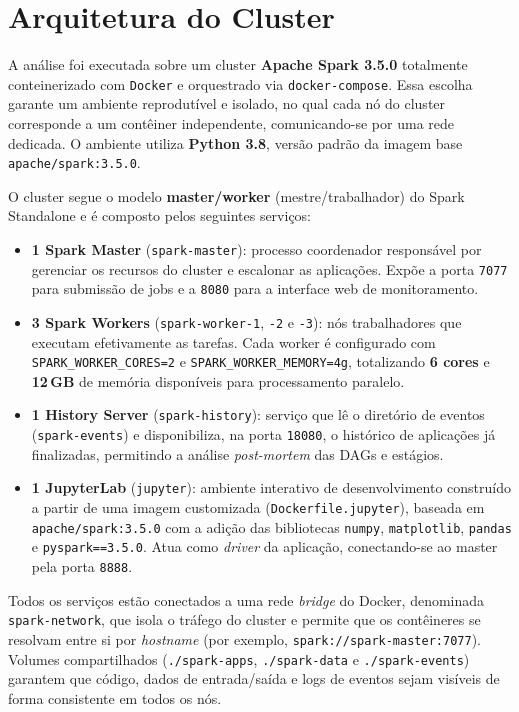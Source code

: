 \section{Arquitetura do Cluster}
\label{sec:arquitetura}

A análise foi executada sobre um cluster \textbf{Apache Spark 3.5.0} totalmente
conteinerizado com \texttt{Docker} e orquestrado via \texttt{docker-compose}. Essa
escolha garante um ambiente reprodutível e isolado, no qual cada nó do cluster
corresponde a um contêiner independente, comunicando-se por uma rede dedicada. O
ambiente utiliza \textbf{Python 3.8}, versão padrão da imagem base
\texttt{apache/spark:3.5.0}.

O cluster segue o modelo \textbf{master/worker} (mestre/trabalhador) do Spark Standalone
e é composto pelos seguintes serviços:

\begin{itemize}
  \item \textbf{1 Spark Master} (\texttt{spark-master}): processo coordenador
        responsável por gerenciar os recursos do cluster e escalonar as aplicações.
        Expõe a porta \texttt{7077} para submissão de jobs e a \texttt{8080} para a
        interface web de monitoramento.
  \item \textbf{3 Spark Workers} (\texttt{spark-worker-1}, \texttt{-2} e \texttt{-3}):
        nós trabalhadores que executam efetivamente as tarefas. Cada worker é
        configurado com \texttt{SPARK\_WORKER\_CORES=2} e
        \texttt{SPARK\_WORKER\_MEMORY=4g}, totalizando \textbf{6 cores} e
        \textbf{12\,GB} de memória disponíveis para processamento paralelo.
  \item \textbf{1 History Server} (\texttt{spark-history}): serviço que lê o diretório
        de eventos (\texttt{spark-events}) e disponibiliza, na porta \texttt{18080}, o
        histórico de aplicações já finalizadas, permitindo a análise \textit{post-mortem}
        das DAGs e estágios.
  \item \textbf{1 JupyterLab} (\texttt{jupyter}): ambiente interativo de
        desenvolvimento construído a partir de uma imagem customizada
        (\texttt{Dockerfile.jupyter}), baseada em \texttt{apache/spark:3.5.0} com a
        adição das bibliotecas \texttt{numpy}, \texttt{matplotlib}, \texttt{pandas} e
        \texttt{pyspark==3.5.0}. Atua como \textit{driver} da aplicação, conectando-se
        ao master pela porta \texttt{8888}.
\end{itemize}

Todos os serviços estão conectados a uma rede \textit{bridge} do Docker, denominada
\texttt{spark-network}, que isola o tráfego do cluster e permite que os contêineres se
resolvam entre si por \textit{hostname} (por exemplo, \texttt{spark://spark-master:7077}).
Volumes compartilhados (\texttt{./spark-apps}, \texttt{./spark-data} e
\texttt{./spark-events}) garantem que código, dados de entrada/saída e logs de eventos
sejam visíveis de forma consistente em todos os nós.

